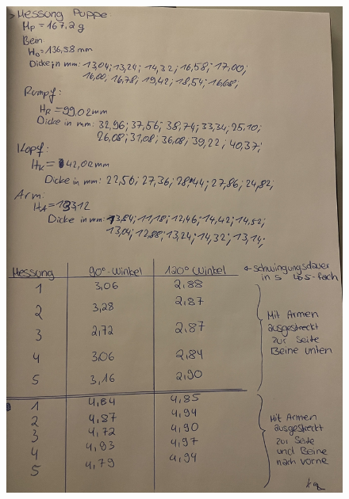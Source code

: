 \begin{figure}[H]
  \centering
  \includegraphics[width=\textwidth]{Messwerte/IMG_7711}
\end{figure}